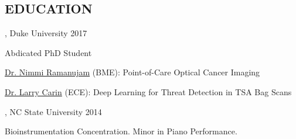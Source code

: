 \documentclass[resmargin, 11pt]{resume_style_class} %
\newenvironment{outline}
  {\begin{list}{}{\setlength{\leftmargin}{30pt}\setlength\itemsep{-2pt}}}
  {\end{list}}
\newenvironment{outline-cond}
  {\begin{list}{}{
  \setlength{\leftmargin}{30pt}
  \setlength\topsep{-10pt}
  \setlength\itemindent{-30pt}
  }}
  {\end{list}}
\begin{document}
\begin{resume}
\section{EDUCATION}

, Duke University \hfill 2017
\begin{outline}
	\item Abdicated PhD Student
	\item \href{https://bme.duke.edu/faculty/nimmi-ramanujam}{Dr. Nimmi Ramanujam} (BME): Point-of-Care Optical Cancer Imaging
	\item \href{https://scholar.google.com/citations?user=ZhGL6WcAAAAJ&hl=en}{Dr. Larry Carin} (ECE): Deep Learning for Threat Detection in TSA Bag Scans
\end{outline}

, NC State University \hfill 2014
\begin{outline}
	\item Bioinstrumentation Concentration. Minor in Piano Performance.
\end{outline}



\end{resume}
\end{document}
